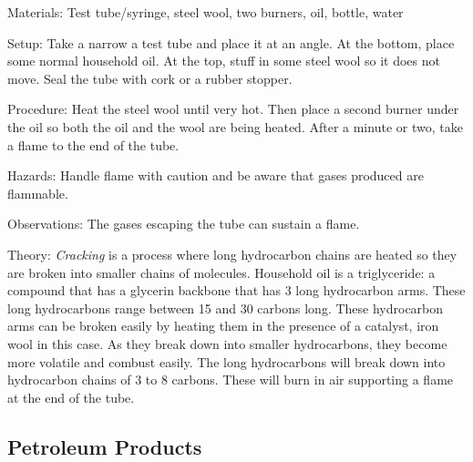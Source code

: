 \begin{multicols}{2}
\begin{description*}
\item[Materials:]{Test tube/syringe, steel wool, two burners, oil, bottle, water}
\item[Setup:]{Take a narrow a test tube and place it at an angle. At the bottom, place some normal household oil. At the top, stuff in some steel wool so it does not move. Seal the tube with cork or a rubber stopper.}
\item[Procedure:]{Heat the steel wool until very hot. Then place a second burner under the oil so both the oil and the wool are being heated. After a minute or two, take a flame to the end of the tube.}
\item[Hazards:]{Handle flame with caution and be aware that gases produced are flammable.}
\item[Observations:]{The gases escaping the tube can sustain a flame.}
\item[Theory:]{\emph{Cracking} is a process where long hydrocarbon chains are heated so they are broken into smaller chains of molecules. Household oil is a triglyceride: a compound that has a glycerin backbone that has 3 long hydrocarbon arms. These long hydrocarbons range between 15 and 30 carbons long. These hydrocarbon arms can be broken easily by heating them in the presence of a catalyst, iron wool in this case. As they break down into smaller hydrocarbons, they become more volatile and combust easily. The long hydrocarbons will break down into hydrocarbon chains of 3 to 8 carbons. These will burn in air supporting a flame at the end of the tube.}
\end{description*}

\subsection{Petroleum Products}



\end{multicols}
